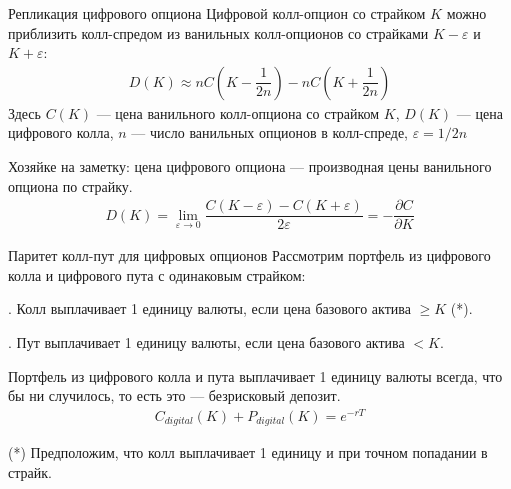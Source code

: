 \documentclass{beamer}
\newcommand{\en}[1]{\begin{otherlanguage}{english}#1\end{otherlanguage}}
\begin{document}
\begin{frame}{Репликация цифрового опциона}
\justify
Цифровой колл-опцион со страйком $K$ можно приблизить колл-спредом из ванильных
колл-опционов со страйками $K-\varepsilon$ и $K+\varepsilon$:
\begin{align*}
D(K) \approx nC\left(K - \dfrac{1}{2n}\right) - nC\left(K + \dfrac{1}{2n}\right)
\end{align*}
Здесь $C(K)$ --- цена ванильного колл-опциона со страйком $K$, $D(K)$ --- цена 
цифрового колла, $n$ --- число ванильных опционов в колл-спреде, $\varepsilon=1/2n$

\justify
Хозяйке на заметку: цена цифрового опциона --- производная цены ванильного опциона по 
страйку.
\begin{align*}
D(K) = \lim\limits_{\varepsilon\to 0}\dfrac{C(K-\varepsilon) - C(K+\varepsilon)}{2\varepsilon} = -\dfrac{\partial C}{\partial K}
\end{align*}
\end{frame}



\begin{frame}{Паритет колл-пут для цифровых опционов}
\justify
Рассмотрим портфель из цифрового колла и цифрового пута с одинаковым страйком:

. Колл выплачивает 1 единицу валюты, если цена базового актива $\ge K$ (*).

. Пут выплачивает 1 единицу валюты, если цена базового актива $< K$.

\justify
Портфель из цифрового колла и пута выплачивает 1 единицу валюты всегда, что бы ни 
случилось, то есть это --- безрисковый депозит.
\begin{align*}
C_{digital}(K) + P_{digital}(K) = e^{-rT}
\end{align*}

\justify
(*) Предположим, что колл выплачивает 1 единицу и при точном попадании в страйк.
\end{frame}



\end{document}
